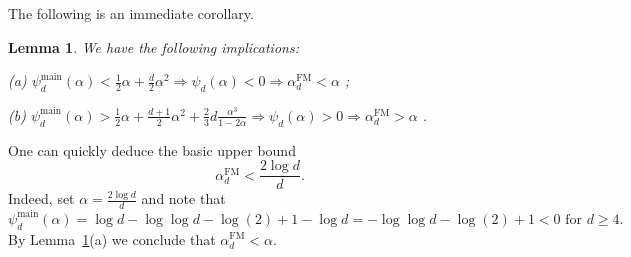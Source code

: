 \documentclass[12pt]{amsart}
\newtheorem{lemma}[theorem]{Lemma}
\theoremstyle{definition}
\newcommand\ds{\displaystyle}
\newcommand\al{\alpha}
\newcommand\alfm{\alpha^{\mathrm{FM}}}
\newcommand\psimain{\psi^{\mathrm{main}}}
\begin{document}
The following is an immediate corollary.
%
\begin{lemma} \label{lem:implications}
We have the following implications:

\medskip

\noindent (a) \;
%
$\ds \psimain_d(\al) 
< \frac 12 \al + \frac{d}{2}\al^2 
\Longrightarrow 
\psi_d(\al) < 0 
\Longrightarrow
\alfm_d < \al$ ;
%

\medskip

\noindent (b) \;
%
$\ds \psimain_d(\al) 
> \frac 12 \al + \frac{d+1}{2}\al^2 
+ \frac 23 d \frac{\al^3}{1-2\al} 
\Longrightarrow 
\psi_d(\al) > 0 
\Longrightarrow
\alfm_d > \al$ .
%
\end{lemma}
%

One can quickly deduce the basic upper bound 
%
\begin{equation} \label{eq:al_basic_upper}
\alfm_d < \frac{2 \log d}{d} .
\end{equation}
%
Indeed, set $\al=\frac{2\log d}{d}$ and note that 
%
\[ \psimain_d(\al) = \log d - \log\log d - \log(2) + 1 - \log d = - \log\log d - \log(2) + 1 
< 0 \text{ for } d \geq 4 .\]
%
By Lemma~\ref{lem:implications}(a) we conclude that $\alfm_d < \al$. 


\end{document}
